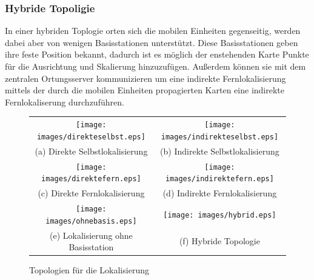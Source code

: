 \subsubsection{Hybride Topoligie}
In einer hybriden Toplogie orten sich die mobilen Einheiten gegenseitig, werden dabei aber von wenigen Basisstationen unterstützt.
Diese Basisstationen geben ihre feste Position bekannt, dadurch ist es möglich der enstehenden Karte Punkte für die Ausrichtung und Skalierung hinzuzufügen.
Außerdem können sie mit dem zentralen Ortungsserver kommunizieren um eine indirekte Fernlokalisierung mittels der durch die mobilen Einheiten propagierten Karten eine indirekte Fernlokaliserung durchzuführen.

\begin{figure}[h!]
	\centering

	\begin{tabular}{cc}
		\texttt{[image: images/direkteselbst.eps]} & \texttt{[image: images/indirekteselbst.eps]} \\
		(a) Direkte Selbstlokalisierung & (b) Indirekte Selbstlokalisierung \\
		\texttt{[image: images/direktefern.eps]} & \texttt{[image: images/indirektefern.eps]} \\
		(c) Direkte Fernlokalisierung & (d) Indirekte Fernlokalisierung \\
		\texttt{[image: images/ohnebasis.eps]} & \texttt{[image: images/hybrid.eps]} \\
		(e) Lokalisierung ohne Basisstation & (f) Hybride Topologie \\
	\end{tabular}
	\caption{Topologien für die Lokalisierung}
	\label{fig:topo}
\end{figure}

